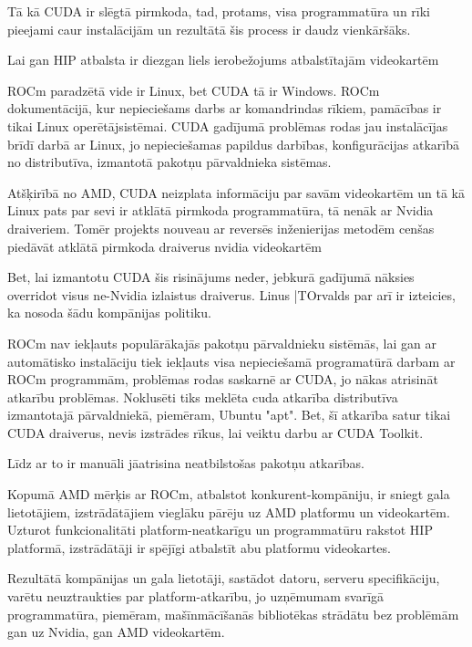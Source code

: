 \documentclass[12pt]{report}%
\theoremstyle{definition}
\begin{document}
Tā kā CUDA ir slēgtā pirmkoda, tad, protams, visa programmatūra un rīki pieejami caur instalācijām un
rezultātā šis process ir daudz vienkāršāks.

Lai gan HIP atbalsta ir diezgan liels ierobežojums atbalstītajām videokartēm




ROCm paradzētā vide ir Linux, bet CUDA tā ir Windows. ROCm dokumentācijā, kur nepieciešams darbs ar komandrindas rīkiem, pamācības ir tikai Linux operētājsistēmai. CUDA gadījumā problēmas rodas jau instalācījas brīdī darbā ar Linux, jo nepieciešamas papildus darbības, konfigurācijas atkarībā no distributīva, izmantotā pakotņu pārvaldnieka sistēmas.

Atšķirībā no AMD, CUDA neizplata informāciju par savām videokartēm un tā kā Linux pats par sevi ir atklātā
pirmkoda programmatūra, tā nenāk ar Nvidia draiveriem. Tomēr projekts nouveau ar reversēs inženierijas
metodēm cenšas piedāvāt atklātā pirmkoda draiverus nvidia videokartēm

Bet, lai izmantotu CUDA šis risinājums neder, jebkurā gadījumā nāksies overridot visus ne-Nvidia izlaistus draiverus. Linus |TOrvalds par arī ir izteicies, ka nosoda šādu kompānijas politiku.





ROCm nav iekļauts populārākajās pakotņu pārvaldnieku sistēmās, lai gan ar automātisko instalāciju 
tiek iekļauts visa nepieciešamā programatūrā darbam ar ROCm programmām, problēmas rodas saskarnē ar
CUDA, jo nākas atrisināt atkarību problēmas. Noklusēti tiks meklēta cuda atkarība distributīva izmantotajā
pārvaldniekā, piemēram, Ubuntu "apt". Bet, šī atkarība satur tikai CUDA draiverus, nevis 
izstrādes rīkus, lai veiktu darbu ar CUDA Toolkit. 

Līdz ar to ir manuāli jāatrisina neatbilstošas pakotņu atkarības.






Kopumā AMD mērķis ar ROCm, atbalstot konkurent-kompāniju, ir sniegt gala lietotājiem, izstrādātājiem
vieglāku pārēju uz AMD platformu un videokartēm. Uzturot funkcionalitāti platform-neatkarīgu un
programmatūru rakstot HIP platformā, izstrādātāji ir spējīgi atbalstīt abu platformu videokartes.

Rezultātā kompānijas un gala lietotāji, sastādot datoru, serveru specifikāciju, varētu neuztraukties
par platform-atkarību, jo uzņēmumam svarīgā programmatūra, piemēram, mašīnmācīšanās bibliotēkas
strādātu bez problēmām gan uz Nvidia, gan AMD videokartēm.
\end{document}
